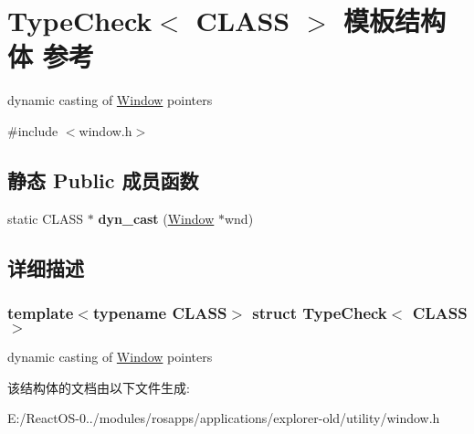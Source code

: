 \hypertarget{struct_type_check}{}\section{Type\+Check$<$ C\+L\+A\+SS $>$ 模板结构体 参考}
\label{struct_type_check}


dynamic casting of \hyperlink{struct_window}{Window} pointers  




{\ttfamily \#include $<$window.\+h$>$}

\subsection*{静态 Public 成员函数}
\begin{DoxyCompactItemize}
\item 
\mbox{\label{struct_type_check_a7684e514f5b675808e83321eac2ab9b7}} 
static C\+L\+A\+SS $\ast$ {\bfseries dyn\+\_\+cast} (\hyperlink{struct_window}{Window} $\ast$wnd)
\end{DoxyCompactItemize}


\subsection{详细描述}
\subsubsection*{template$<$typename C\+L\+A\+SS$>$\newline
struct Type\+Check$<$ C\+L\+A\+S\+S $>$}

dynamic casting of \hyperlink{struct_window}{Window} pointers 

该结构体的文档由以下文件生成\+:\begin{DoxyCompactItemize}
\item 
E\+:/\+React\+O\+S-\/0../modules/rosapps/applications/explorer-\/old/utility/window.\+h\end{DoxyCompactItemize}
